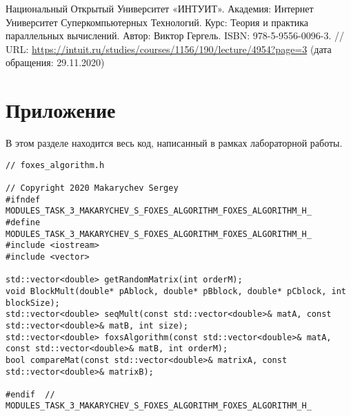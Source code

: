 \documentclass{report}
\begin{document}
\begin{thebibliography}{1}
 Национальный Открытый Университет «ИНТУИТ». Академия: Интернет Университет Суперкомпьютерных Технологий. Курс: Теория и практика параллельных вычислений. Автор: Виктор Гергель. ISBN: 978-5-9556-0096-3. // URL: \url {https://intuit.ru/studies/courses/1156/190/lecture/4954?page=3} (дата обращения: 29.11.2020)
\end{thebibliography}
\newpage

\section*{Приложение}
В этом разделе находится весь код, написанный в рамках лабораторной работы.
\begin{lstlisting}
// foxes_algorithm.h

// Copyright 2020 Makarychev Sergey
#ifndef  MODULES_TASK_3_MAKARYCHEV_S_FOXES_ALGORITHM_FOXES_ALGORITHM_H_
#define  MODULES_TASK_3_MAKARYCHEV_S_FOXES_ALGORITHM_FOXES_ALGORITHM_H_
#include <iostream>
#include <vector>

std::vector<double> getRandomMatrix(int orderM);
void BlockMult(double* pAblock, double* pBblock, double* pCblock, int blockSize);
std::vector<double> seqMult(const std::vector<double>& matA, const std::vector<double>& matB, int size);
std::vector<double> foxsAlgorithm(const std::vector<double>& matA, const std::vector<double>& matB, int orderM);
bool compareMat(const std::vector<double>& matrixA, const std::vector<double>& matrixB);

#endif  //  MODULES_TASK_3_MAKARYCHEV_S_FOXES_ALGORITHM_FOXES_ALGORITHM_H_

\end{lstlisting}
\end{document}
